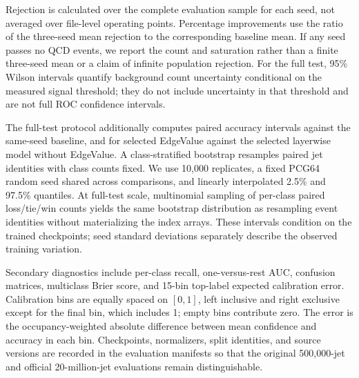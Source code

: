 Rejection is calculated over the complete evaluation sample for each seed,
not averaged over file-level operating points. Percentage improvements use
the ratio of the three-seed mean rejection to the corresponding baseline
mean. If any seed passes no QCD events, we report the count and saturation
rather than a finite three-seed mean or a claim of infinite population
rejection. For the full test, 95\% Wilson intervals quantify background
count uncertainty conditional on the measured signal threshold; they do
not include uncertainty in that threshold and are not full ROC confidence
intervals.

The full-test protocol additionally computes paired accuracy intervals
against the same-seed baseline, and for selected EdgeValue against the
selected layerwise model without EdgeValue. A class-stratified bootstrap
resamples paired jet identities with class counts fixed. We use 10,000
replicates, a fixed PCG64 random seed shared across comparisons, and
linearly interpolated 2.5\% and 97.5\% quantiles. At full-test scale, multinomial sampling of per-class paired
loss/tie/win counts yields the same bootstrap distribution as resampling
event identities without materializing the index arrays. These intervals
condition on the trained checkpoints; seed standard deviations separately
describe the observed training variation.

Secondary diagnostics include per-class recall, one-versus-rest AUC,
confusion matrices, multiclass Brier score, and 15-bin top-label expected
calibration error. Calibration bins are equally spaced on $[0,1]$, left
inclusive and right exclusive except for the final bin, which includes 1;
empty bins contribute zero. The error is the occupancy-weighted absolute
difference between mean confidence and accuracy in each bin. Checkpoints,
normalizers, split identities, and source versions are recorded in the
evaluation manifests so that the original 500,000-jet and official
20-million-jet evaluations remain distinguishable.
